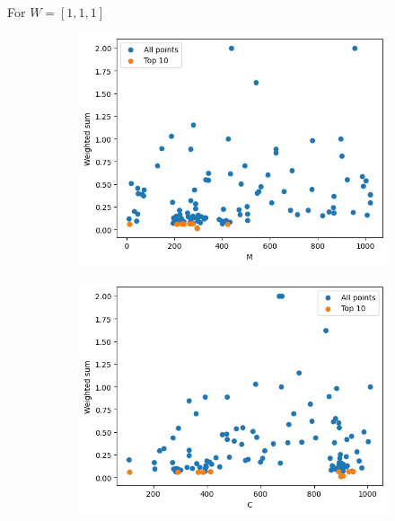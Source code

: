 \begin{frame}
    For \(W = [1, 1, 1]\)
    \begin{figure}
        \centering
        \hfill
        \begin{subfigure}{0.45\textwidth}
            \includegraphics[width=\textwidth]{../images/report/w111-M.png}
        \end{subfigure}
        \hfill
        \begin{subfigure}{0.45\textwidth}
            \includegraphics[width=\textwidth]{../images/report/w111-C.png}
        \end{subfigure}
        \hfill
        

\end{figure}
\end{frame}
